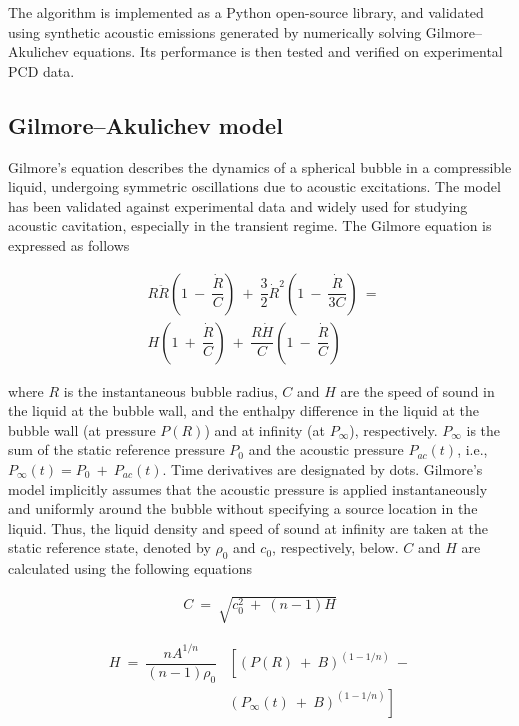 \documentclass[preprint, linenumbers]{revtex4-2}
\begin{document}
The algorithm is implemented as a Python open-source library, \cite{wpt-cavitation2024} and validated using synthetic acoustic emissions generated by numerically solving Gilmore--Akulichev equations. Its performance is then tested and verified on experimental PCD data. 

\subsection{Gilmore--Akulichev model}
\label{sec:GA_model}
Gilmore's equation describes the dynamics of a spherical bubble in a compressible liquid, undergoing symmetric oscillations due to acoustic excitations. The model has been validated against experimental data and widely used for studying acoustic cavitation, especially in the transient regime.\cite{lauterborn2010} The Gilmore equation is expressed as follows \cite{gilmore1952}

\begin{align}
	\label{eq:gilmore}
	  & R \ddot{R}\left(1~-~\dfrac{\dot{R}}{C}\right) ~+~ \dfrac{3}{2}{\dot{R}}^2 \left(1~-~\dfrac{\dot{R}}{3C}\right) ~=~ \nonumber \\
	  & H \left(1~+~\dfrac{\dot{R}}{C}\right)  ~+~ \dfrac{R \dot{H}}{C}\left(1~-~\dfrac{\dot{R}}{C}\right)                           
\end{align}

\noindent where $R$ is the instantaneous bubble radius, $C$ and $H$ are the speed of sound in the liquid at the bubble wall, and the enthalpy difference in the liquid at the bubble wall (at pressure $P(R)$) and at infinity (at $P_\infty$), respectively. $P_\infty$ is the sum of the static reference pressure $P_0$ and the acoustic pressure $P_{ac}(t)$, i.e., $P_\infty(t)=P_0~+~P_{ac}(t)$. Time derivatives are designated by dots. Gilmore's model implicitly assumes that the acoustic pressure is applied instantaneously and uniformly around the bubble without specifying a source location in the liquid. Thus, the liquid density and speed of sound at infinity are taken at the static reference state, denoted by $\rho_0$ and $c_0$, respectively, below. $C$ and $H$ are calculated using the following equations

\begin{align}
	\label{eq:wavespeed}        
	C ~=~ \sqrt{c_0^2~+~(n-1)H} 
\end{align}

\begin{align}
	\label{eq:enthalpy}
	H ~=~ \dfrac{n A^{1/n}}{(n-1)\rho_0} & \left[ \left(P(R) ~+~ B\right)^{\left(1-1/n\right)} ~ - \right. \nonumber \\
	                                     & \left. \left(P_\infty(t) ~+~ B\right)^{\left(1-1/n\right)} \right]        
\end{align}
\end{document}
